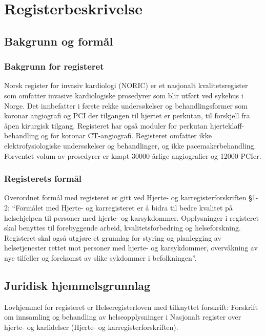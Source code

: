 \documentclass[norsk, a4paper]{report}
\begin{document}
\chapter{Registerbeskrivelse}\label{cha:reg}


\section{Bakgrunn og formål}

\subsection{Bakgrunn for registeret}\label{sec:bak}
Norsk register for invasiv kardiologi (NORIC) er et nasjonalt kvalitetsregister som omfatter invasive kardiologiske prosedyrer som blir utført ved sykehus i Norge. Det innbefatter i første rekke undersøkelser og behandlingsformer som koronar angiografi og PCI der tilgangen til hjertet er perkutan, til forskjell fra åpen kirurgisk tilgang. Registeret har også moduler for perkutan hjerteklaff-behandling og for koronar CT-angiografi. Registeret omfatter ikke elektrofysiologiske undersøkelser og behandlinger, og ikke pacemakerbehandling. Forventet volum av prosedyrer er knapt 30000 årlige angiografier og 12000 PCIer.  

\subsection{Registerets formål}\label{sec:for}
Overordnet formål med registeret er gitt ved Hjerte- og karregisterforskriften §1-2: 
``Formålet med Hjerte- og karregisteret er å bidra til bedre kvalitet på helsehjelpen til personer med hjerte- og karsykdommer. Opplysninger i registeret skal benyttes til forebyggende arbeid, kvalitetsforbedring og helseforskning. Registeret skal også utgjøre et grunnlag for styring og planlegging av helsetjenester rettet mot personer med hjerte- og karsykdommer, overvåkning av nye tilfeller og forekomst av slike sykdommer i befolkningen''.

\section{Juridisk hjemmelsgrunnlag}\label{cha:jur}
Lovhjemmel for registeret er Helseregisterloven med tilknyttet forskrift: Forskrift om innsamling og behandling av helseopplysninger i Nasjonalt register over hjerte- og karlidelser (Hjerte- og karregisterforskriften). 
\end{document}
